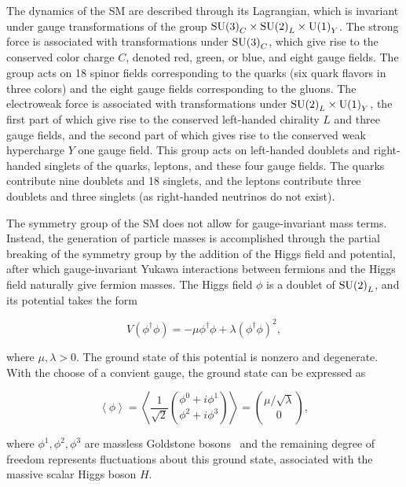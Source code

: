 The dynamics of the SM are described through its Lagrangian, which is invariant under
gauge transformations of the group ${\rm SU(3)}_C \times {\rm SU(2)}_L \times {\rm U(1)}_Y$.
The strong force is associated with transformations under ${\rm SU(3)}_C$, which give rise to
the conserved color charge $C$, denoted red, green, or blue, and eight gauge fields.
The group acts on 18 spinor fields corresponding to the quarks (six quark flavors in three colors)
and the eight gauge fields corresponding to the gluons.
The electroweak force is associated with transformations under ${\rm SU(2)}_L \times {\rm U(1)}_Y$,
the first part of which give rise to the conserved left-handed chirality $L$ and three gauge fields,
and the second part of which gives rise to the conserved weak hypercharge $Y$ one gauge field.
This group acts on left-handed doublets and right-handed singlets of the quarks, leptons, and
these four gauge fields. The quarks contribute nine doublets and 18 singlets, and the leptons contribute
three doublets and three singlets (as right-handed neutrinos do not exist).

The symmetry group of the SM does not allow for gauge-invariant mass terms. Instead,
the generation of particle masses is accomplished through the partial breaking of the
symmetry group by the addition of the Higgs field and potential, after which gauge-invariant
Yukawa interactions between fermions and the Higgs field naturally give fermion masses.
The Higgs field $\phi$ is a doublet of ${\rm SU(2)}_L$, and its potential takes the form

\begin{equation}
V(\phi^\dagger\phi) = -\mu\phi^\dagger\phi + \lambda(\phi^\dagger\phi)^2 ,
\end{equation}

where $\mu,\lambda > 0$. The ground state of this potential is nonzero and degenerate. With the
choose of a convient gauge, the ground state can be expressed as

\begin{equation}
\left\langle \phi \right\rangle =
\left\langle \frac{1}{\sqrt{2}} {\phi^0+i\phi^1 \choose \phi^2+i\phi^3} \right\rangle =
{\mu / \sqrt{\lambda} \choose 0} ,
\end{equation}

where $\phi^1, \phi^2, \phi^3$ are massless Goldstone
bosons~\cite{1961.Goldstone,1962.Goldstone-Salam-Weinberg.Broken-Symmetries} and the remaining
degree of freedom represents fluctuations about this ground state,
associated with the massive scalar Higgs boson $H$.

